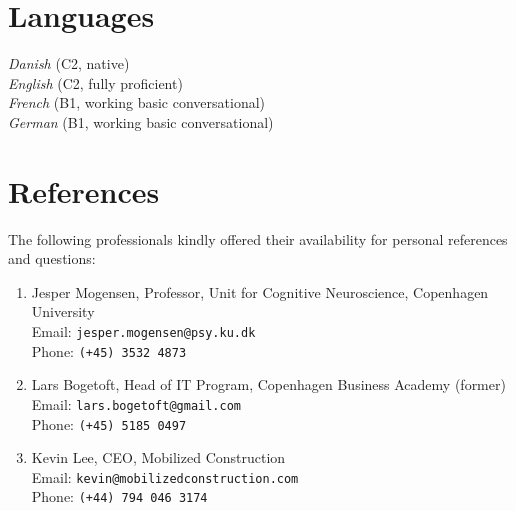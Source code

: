 \documentclass[11pt, a4paper]{article}
\begin{document}
\section*{Languages}
\emph{Danish} (C2, native)\\
\emph{English} (C2, fully proficient)\\
\emph{French} (B1, working basic conversational) \\
\emph{German} (B1, working basic conversational)

\pagebreak
\section*{References}
The following professionals kindly offered their availability for personal
references and questions:
\begin{enumerate}
\item Jesper Mogensen, Professor, Unit for Cognitive Neuroscience, Copenhagen University 
\\ Email: \texttt{jesper.mogensen@psy.ku.dk}
\\ Phone: \texttt{(+45) 3532 4873}
\item Lars Bogetoft, Head of IT Program, Copenhagen Business Academy (former)
\\ Email: \texttt{lars.bogetoft@gmail.com}
\\ Phone: \texttt{(+45) 5185 0497}
\item Kevin Lee, CEO, Mobilized Construction
\\ Email: \texttt{kevin@mobilizedconstruction.com}
\\ Phone: \texttt{(+44) 794 046 3174}
\end{enumerate}
\end{document}
